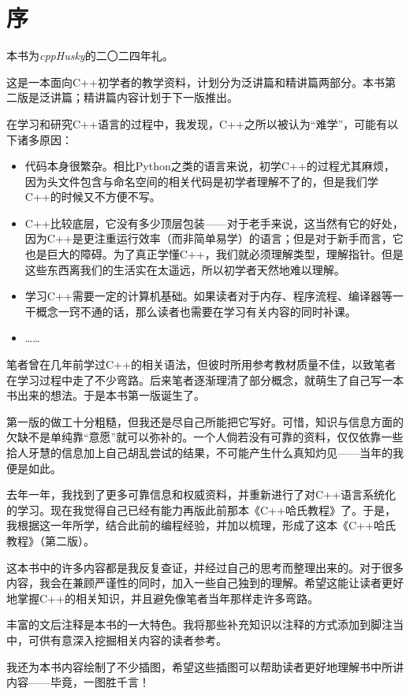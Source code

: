 \chapter{序}
本书为\textit{cppHusky}的二〇二四年礼。\par
这是一本面向C++初学者的教学资料，计划分为泛讲篇和精讲篇两部分。本书第二版是泛讲篇；精讲篇内容计划于下一版推出。\par
在学习和研究C++语言的过程中，我发现，C++之所以被认为``难学''，可能有以下诸多原因：
\begin{itemize}
    \item 代码本身很繁杂。相比Python之类的语言来说，初学C++的过程尤其麻烦，因为头文件包含与命名空间的相关代码是初学者理解不了的，但是我们学C++的时候又不方便不写。
    \item C++比较底层，它没有多少顶层包装——对于老手来说，这当然有它的好处，因为C++是更注重运行效率（而非简单易学）的语言；但是对于新手而言，它也是巨大的障碍。为了真正学懂C++，我们就必须理解类型，理解指针。但是这些东西离我们的生活实在太遥远，所以初学者天然地难以理解。
    \item 学习C++需要一定的计算机基础。如果读者对于内存、程序流程、编译器等一干概念一窍不通的话，那么读者也需要在学习有关内容的同时补课。
    \item ……
\end{itemize}\par
笔者曾在几年前学过C++的相关语法，但彼时所用参考教材质量不佳，以致笔者在学习过程中走了不少弯路。后来笔者逐渐理清了部分概念，就萌生了自己写一本书出来的想法。于是本书第一版诞生了。\par
第一版的做工十分粗糙，但我还是尽自己所能把它写好。可惜，知识与信息方面的欠缺不是单纯靠``意愿''就可以弥补的。一个人倘若没有可靠的资料，仅仅依靠一些拾人牙慧的信息加上自己胡乱尝试的结果，不可能产生什么真知灼见——当年的我便是如此。\par
去年一年，我找到了更多可靠信息和权威资料，并重新进行了对C++语言系统化的学习。现在我觉得自己已经有能力再版此前那本《C++哈氏教程》了。于是，我根据这一年所学，结合此前的编程经验，并加以梳理，形成了这本《C++哈氏教程》（第二版）。\par
这本书中的许多内容都是我反复查证，并经过自己的思考而整理出来的。对于很多内容，我会在兼顾严谨性的同时，加入一些自己独到的理解。希望这能让读者更好地掌握C++的相关知识，并且避免像笔者当年那样走许多弯路。\par
丰富的文后注释是本书的一大特色。我将那些补充知识以注释的方式添加到脚注当中，可供有意深入挖掘相关内容的读者参考。\par
我还为本书内容绘制了不少插图，希望这些插图可以帮助读者更好地理解书中所讲内容——毕竟，一图胜千言！\par
